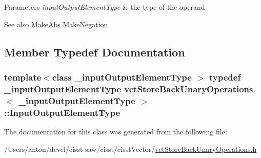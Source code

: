 \begin{DoxyParams}{Parameters}
{\em input\+Output\+Element\+Type} & the type of the operand\\
\hline
\end{DoxyParams}
\begin{DoxySeeAlso}{See also}
\hyperlink{classvct_store_back_unary_operations_1_1_make_abs}{Make\+Abs} \hyperlink{classvct_store_back_unary_operations_1_1_make_negation}{Make\+Negation} 
\end{DoxySeeAlso}


\subsection{Member Typedef Documentation}
\hypertarget{classvct_store_back_unary_operations_a8af17faaa73a8d090094d468eee32062}{}
\subsubsection[{Input\+Output\+Element\+Type}]{\setlength{\rightskip}{0pt plus 5cm}template$<$class \+\_\+input\+Output\+Element\+Type $>$ typedef \+\_\+input\+Output\+Element\+Type {\bf vct\+Store\+Back\+Unary\+Operations}$<$ \+\_\+input\+Output\+Element\+Type $>$\+::{\bf Input\+Output\+Element\+Type}}\label{classvct_store_back_unary_operations_a8af17faaa73a8d090094d468eee32062}


The documentation for this class was generated from the following file\+:\begin{DoxyCompactItemize}
\item 
/\+Users/anton/devel/cisst-\/saw/cisst/cisst\+Vector/\hyperlink{vct_store_back_unary_operations_8h}{vct\+Store\+Back\+Unary\+Operations.\+h}\end{DoxyCompactItemize}
